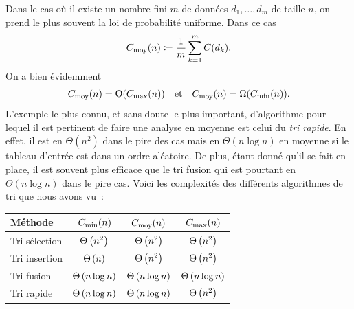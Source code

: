 \documentclass{magnolia}
\begin{document}
\begin{remarques}
\remarque Dans le cas où il existe un nombre fini $m$ de données $d_1,\ldots,d_m$ de taille $n$, on prend
  le plus souvent la loi de probabilité uniforme. Dans ce cas
  \[C_{\rm moy}(n)\coloneqq \frac{1}{m}\sum_{k=1}^m C(d_k).\]
\remarque On a bien évidemment
  \[C_{\rm moy}(n) = {\rm O}(C_{\rm max}(n)) \quad\text{et}\quad C_{\rm moy}(n) = \Omega(C_{\rm min}(n)).\]
\remarque L'exemple le plus connu, et sans doute le plus important, d'algorithme
pour lequel il est pertinent de faire une analyse en moyenne est
celui du \emph{tri rapide}. En effet, il est en $\Theta\left(n^2\right)$
dans le pire des cas mais en $\Theta(n \log n)$ en moyenne si
le tableau d'entrée est dans un ordre aléatoire. De plus, étant donné qu'il se fait
en place, il est
souvent plus efficace que le tri fusion qui est pourtant en
$\Theta(n \log n)$ dans le pire cas.
\remarque Voici les complexités des différents algorithmes de tri que nous avons vu~:
\begin{center}
\begin{tabular}{|l|c|c|c|}
\hline
Méthode & $C_{\rm min}(n)$ & $C_{\rm moy}(n)$ & $C_{\rm max}(n)$ \\
\hline
\hline
Tri sélection & $\Theta\left(n^2\right)$ & $\Theta\left(n^2\right)$& $\Theta\left(n^2\right)$\\
\hline
Tri insertion & $\Theta\left(n\right)$& $\Theta\left(n^2\right)$& $\Theta\left(n^2\right)$\\
\hline
Tri fusion & $\Theta\left(n \log n\right)$ & $\Theta\left(n \log n\right)$& $\Theta\left(n \log n\right)$\\
\hline
Tri rapide & $\Theta\left(n \log n\right)$& $\Theta\left(n \log n\right)$&  $\Theta\left(n^2\right)$\\
\hline
\end{tabular}
\end{center}
\end{remarques}


\end{document}
